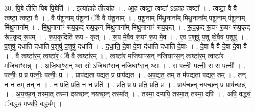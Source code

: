 \documentclass[17pt]{extarticle}
\begin{document}
30. पि॒बे तीति॑ पिब पि॒बेति॑ । . इत्या॑हा॒हे तीत्या॑ह । . आ॒ह॒ त्वष्टा॒ त्वष्टा॑ ऽऽहाह॒ त्वष्टा᳚ । . त्वष्टा॒ वै वै त्वष्टा॒ त्वष्टा॒ वै । . वै प॑शू॒नाम् प॑शू॒नां ॅवै वै प॑शू॒नाम् । . प॒शू॒नाम् मि॑थु॒नाना᳚म् मिथु॒नाना᳚म् पशू॒नाम् प॑शू॒नाम् मि॑थु॒नाना᳚म् । . मि॒थु॒नानाꣳ॑ रूप॒कृद् रू॑प॒कृन् मि॑थु॒नाना᳚म् मिथु॒नानाꣳ॑ रूप॒कृत् । . रू॒प॒कृद् रू॒पꣳ रू॒पꣳ रू॑प॒कृद् रू॑प॒कृद् रू॒पम् । . रू॒प॒कृदिति॑ रूप - कृत् । . रू॒प मे॒वैव रू॒पꣳ रू॒प मे॒व । . ए॒व प॒शुषु॑ प॒शु ष्वे॒वैव प॒शुषु॑ । . प॒शुषु॑ दधाति दधाति प॒शुषु॑ प॒शुषु॑ दधाति । . द॒धा॒ति॒ दे॒वा दे॒वा द॑धाति दधाति दे॒वाः । . दे॒वा वै वै दे॒वा दे॒वा वै । . वै त्वष्टा॑र॒म् त्वष्टा॑रं॒ ॅवै वै त्वष्टा॑रम् । . त्वष्टा॑र मजिघाꣳसन् नजिघाꣳस॒न् त्वष्टा॑र॒म् त्वष्टा॑र मजिघाꣳसन्न् । . अ॒जि॒घाꣳ॒॒स॒न् थ्स सो॑ ऽजिघाꣳसन् नजिघाꣳस॒न् थ्सः । . स पत्नीः॒ पत्नीः॒ स स पत्नीः᳚ । . पत्नीः॒ प्र प्र पत्नीः॒ पत्नीः॒ प्र । . प्राप॑द्यता पद्यत॒ प्र प्राप॑द्यत । . अ॒प॒द्य॒त॒ तम् त म॑पद्यता पद्यत॒ तम् । . तन् न न तम् तन् न । . न प्रति॒ प्रति॒ न न प्रति॑ । . प्रति॒ प्र प्र प्रति॒ प्रति॒ प्र । . प्राय॑च्छन् नयच्छ॒न् प्र प्राय॑च्छन्न् । . अ॒य॒च्छ॒न् तस्मा॒त् तस्मा॑ दयच्छन् नयच्छ॒न् तस्मा᳚त् । . तस्मा॒ दप्यपि॒ तस्मा॒त् तस्मा॒ दपि॑ । . अपि॒ वद्ध्यं॒ ॅवद्ध्य॒ मप्यपि॒ वद्ध्य᳚म् । \newline
\end{document}
